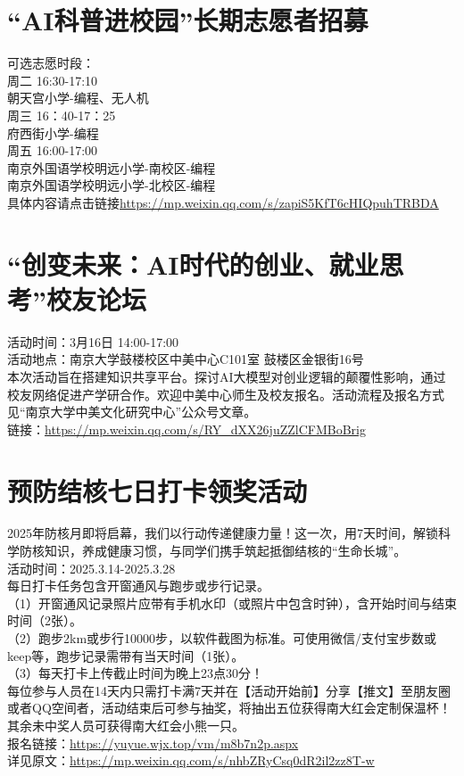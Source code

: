 \documentclass[letterpaper, 12pt]{article}
\begin{document}
\begin{multicols}{2}
\section{“AI科普进校园”长期志愿者招募}
可选志愿时段：\\
周二 16:30-17:10\\
朝天宫小学-编程、无人机\\
周三 16：40-17：25\\
府西街小学-编程\\
周五 16:00-17:00\\
南京外国语学校明远小学-南校区-编程\\
南京外国语学校明远小学-北校区-编程\\
具体内容请点击链接\url{https://mp.weixin.qq.com/s/zapiS5KfT6cHIQpuhTRBDA}\\

\section{“创变未来：AI时代的创业、就业思考”校友论坛}
活动时间：3月16日 14:00-17:00\\
活动地点：南京大学鼓楼校区中美中心C101室 鼓楼区金银街16号\\
本次活动旨在搭建知识共享平台。探讨AI大模型对创业逻辑的颠覆性影响，通过校友网络促进产学研合作。欢迎中美中心师生及校友报名。活动流程及报名方式见“南京大学中美文化研究中心”公众号文章。\\
链接：\url{https://mp.weixin.qq.com/s/RY_dXX26juZZlCFMBoBrig}\\
\section{预防结核七日打卡领奖活动}
2025年防核月即将启幕，我们以行动传递健康力量！这一次，用7天时间，解锁科学防核知识，养成健康习惯，与同学们携手筑起抵御结核的“生命长城”。\\
活动时间：2025.3.14-2025.3.28\\
每日打卡任务包含开窗通风与跑步或步行记录。\\
（1）开窗通风记录照片应带有手机水印（或照片中包含时钟），含开始时间与结束时间（2张）。\\
（2）跑步2km或步行10000步，以软件截图为标准。可使用微信/支付宝步数或keep等，跑步记录需带有当天时间（1张）。\\
（3）每天打卡上传截止时间为晚上23点30分！\\
每位参与人员在14天内只需打卡满7天并在【活动开始前】分享【推文】至朋友圈或者QQ空间者，活动结束后可参与抽奖，将抽出五位获得南大红会定制保温杯！其余未中奖人员可获得南大红会小熊一只。\\
报名链接：\url{https://yuyue.wjx.top/vm/m8b7n2p.aspx}\\
详见原文：\url{https://mp.weixin.qq.com/s/nhbZRyCsq0dR2il2zz8T-w}


\end{multicols}
\end{document}
